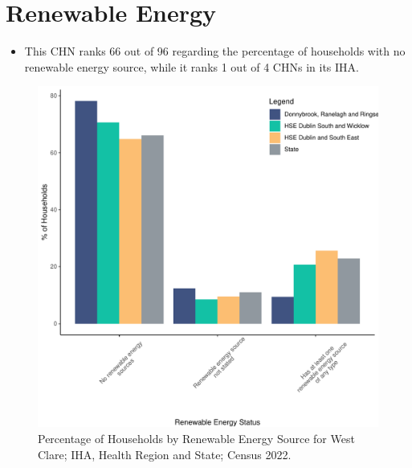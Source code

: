 \documentclass{article}
\begin{document}
\section{Renewable Energy}\label{sect:RE}
\begin{itemize}
\item This CHN ranks  66 out of 96 regarding the percentage of households with no renewable energy source, while it ranks   1 out of 4 CHNs in its IHA.
\end{itemize}
\begin{figure}[H]
	\centering
	\includegraphics[width = 140mm]{../figures/RenewableEnergyED.pdf}
	\caption{Percentage of Households by Renewable Energy Source for West Clare; IHA, Health Region and State; Census 2022.}
	\label{fig:vbnv}
	\end{figure}
\end{document}
